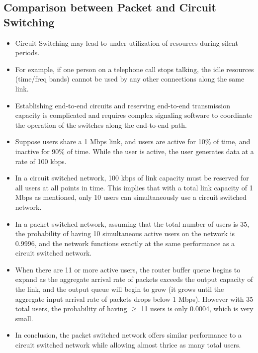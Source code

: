 \documentclass{article}
\theoremstyle{plain}
\theoremstyle{definition}
\begin{document}
\subsection{Comparison between Packet and Circuit Switching}
\begin{itemize}
    \item Circuit Switching may lead to under utilization of resources during silent periods. 
    
    \item For example, if one person on a telephone call stops talking, the idle resources (time/freq bands) cannot be used by any other connections along the same link. 
    
    \item Establishing end-to-end circuits and reserving end-to-end transmission capacity is complicated and requires complex signaling software to coordinate the operation of the switches along the end-to-end path.
    
    \item Suppose users share a 1 Mbps link, and users are active for 10\% of time, and inactive for 90\% of time. While the user is active, the user generates data at a rate of 100 kbps. 
    
    \item In a circuit switched network, 100 kbps of link capacity must be reserved for all users at all points in time. This implies that with a total link capacity of 1 Mbps as mentioned, only 10 users can simultaneously use a circuit switched network. 
    
    \item In a packet switched network, assuming that the total number of users is 35, the probability of having 10 simultaneous active users on the network is 0.9996, and the network functions exactly at the same performance as a circuit switched network. 
    
    \item When there are 11 or more active users, the router buffer queue begins to expand as the aggregate arrival rate of packets exceeds the output capacity of the link, and the output queue will begin to grow (it grows until the aggregate input arrival rate of packets drops below 1 Mbps). However with 35 total users, the probability of having $\geq$ 11 users is only 0.0004, which is very small. 
    
    \item In conclusion, the packet switched network offers similar performance to a circuit switched network while allowing almost thrice as many total users. 
\end{itemize}
\end{document}
